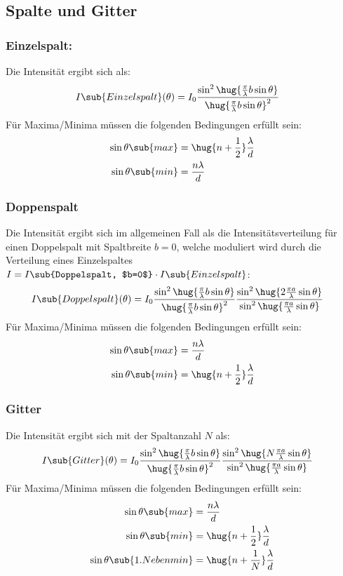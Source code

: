 \documentclass[twocolumn, unnumberedsubsub]{summery_5.0} %
\begin{document}
\subsection{Spalte und Gitter}
{
\subsubsection{Einzelspalt:}
Die Intensität ergibt sich als:
\begin{align*}
    I\sub{Einzelspalt}(\theta) &= I_0 \frac{\sin^2\hug{\frac{\pi}{\lambda}b\sin\theta}}{\hug{\frac\pi \lambda b \sin\theta}^2} 
\end{align*}
Für Maxima/Minima müssen die folgenden Bedingungen erfüllt sein:
\begin{align*}
    \sin\theta\sub{max} &=  \hug{n+\frac12}\frac{\lambda}{d}\\    
    \sin\theta\sub{min} &= \frac{n\lambda}{d}    
\end{align*}}\tight

\subsubsection{Doppenspalt}
    Die Intensität ergibt sich im allgemeinen Fall als die Intensitätsverteilung für einen Doppelspalt mit Spaltbreite $b=0$, welche moduliert wird durch die Verteilung eines Einzelspaltes $I =I\sub{Doppelspalt, $b=0$}\cdot I\sub{Einzelspalt}$:
    \begin{align*}
        I\sub{Doppelspalt}(\theta) & = I_0 \frac{\sin^2\hug{\frac{\pi}{\lambda}b\sin\theta}}{\hug{\frac\pi \lambda b \sin\theta}^2} \frac{\sin^2\hug{2\frac{\pi a}\lambda \sin\theta}}{\sin^2 \hug{\frac{\pi a}{\lambda} \sin\theta}}
    \end{align*}
    Für Maxima/Minima müssen die folgenden Bedingungen erfüllt sein:
    \begin{align*}
        \sin\theta\sub{max} &= \frac{n\lambda}{d}\\    
        \sin\theta\sub{min} &= \hug{n+\frac12}\frac{\lambda}{d}  
    \end{align*}\tight


\subsubsection{Gitter}
Die Intensität ergibt sich mit der Spaltanzahl $N$ als:
    \begin{align*}
        I\sub{Gitter}(\theta) &= I_0 \frac{\sin^2\hug{\frac{\pi}{\lambda}b\sin\theta}}{\hug{\frac\pi \lambda b \sin\theta}^2} \frac{\sin^2\hug{N \frac{\pi a}\lambda \sin\theta}}{\sin^2 \hug{\frac{\pi a}{\lambda} \sin\theta}}
    \end{align*}
Für Maxima/Minima müssen die folgenden Bedingungen erfüllt sein:
\begin{align*}
    \sin\theta\sub{max} &=  \frac{n\lambda}{d}\\    
    \sin\theta\sub{min} &= \hug{n+\frac12}\frac{\lambda}{d} \\   
     \sin\theta\sub{1. Nebenmin} &= \hug{n+\frac1N}\frac{\lambda}{d}\\
\end{align*}\tight
\end{document}
